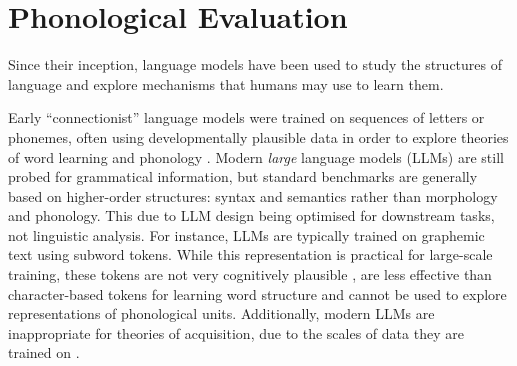 
\section{Phonological Evaluation}\label{sec:12-phoneval}


Since their inception, language models have been used to study the structures of language and explore mechanisms that humans may use to learn them. 


Early ``connectionist'' language models were trained on sequences of letters or phonemes, often using developmentally plausible data in order to explore theories of word learning and phonology \citep{seidenberg1989distributed, norris1994shortlist, coltheart2001drc}. Modern \emph{large} language models (LLMs) are still probed for grammatical information, but standard benchmarks are generally based on higher-order structures: syntax and semantics rather than morphology and phonology. This due to LLM design being optimised for downstream tasks, not linguistic analysis. For instance, LLMs are typically trained on graphemic text using subword tokens. While this representation is practical for large-scale training, these tokens are not very cognitively plausible \citep{beinborn-pinter-2023-analyzing}, are less effective than character-based tokens for learning word structure \citep{bunzeck2025subwordmodelsstruggleword} and cannot be used to explore representations of phonological units. Additionally, modern LLMs are inappropriate for theories of acquisition, due to the scales of data they are trained on \citep{warstadt-2023-babylm-findings}.

